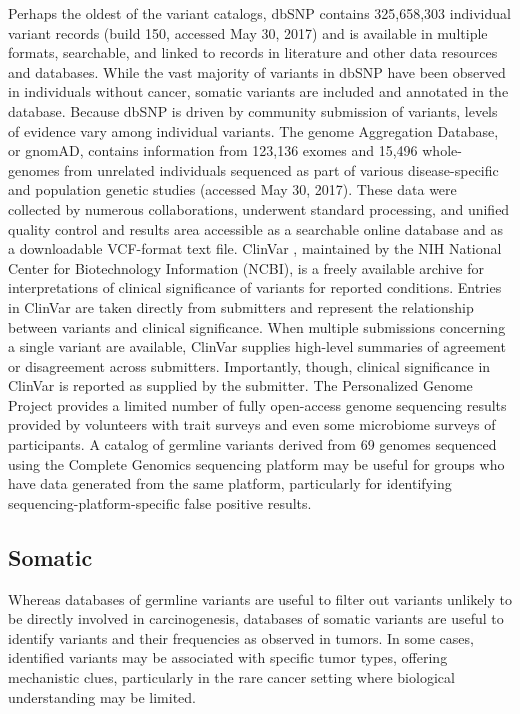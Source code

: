 \documentclass{article}
\begin{document}
Perhaps the oldest of the variant catalogs, dbSNP contains 325,658,303
individual variant records (build 150, accessed May 30, 2017) and is
available in multiple formats, searchable, and linked to records in
literature and other data resources and databases. While the vast
majority of variants in dbSNP have been observed in individuals
without cancer, somatic variants are included and annotated in the
database. Because dbSNP is driven by community submission of variants,
levels of evidence vary among individual variants. The genome
Aggregation Database, or gnomAD, \cite{Lek2016-bb,noauthor_undated-of}
contains information from 123,136 exomes and 15,496 whole-genomes from
unrelated individuals sequenced as part of various disease-specific
and population genetic studies (accessed May 30, 2017). These data
were collected by numerous collaborations, underwent standard
processing, and unified quality control and results area accessible as
a searchable online database and as a downloadable VCF-format text
file. ClinVar \cite{Landrum2016-ul}, maintained by the NIH National
Center for Biotechnology Information (NCBI), is a freely available
archive for interpretations of clinical significance of variants for
reported conditions. Entries in ClinVar are taken directly from
submitters and represent the relationship between variants and
clinical significance. When multiple submissions concerning a single
variant are available, ClinVar supplies high-level summaries of
agreement or disagreement across submitters. Importantly, though,
clinical significance in ClinVar is reported as supplied by the
submitter. The Personalized Genome Project \cite{Church2005-lr}
provides a limited number of fully open-access genome sequencing
results provided by volunteers with trait surveys and even some
microbiome surveys of participants. A catalog of germline variants
derived from 69 genomes sequenced using the Complete Genomics
sequencing platform \cite{Drmanac2010-od} may be useful for groups who
have data generated from the same platform, particularly for
identifying sequencing-platform-specific false positive results.

\subsection{Somatic}

Whereas databases of germline variants are useful to filter
out variants unlikely to be directly involved in carcinogenesis,
databases of somatic variants are useful to identify variants and
their frequencies as observed in tumors. In some cases, identified
variants may be associated with specific tumor types, offering
mechanistic clues, particularly in the rare cancer setting where
biological understanding may be limited.
\end{document}
